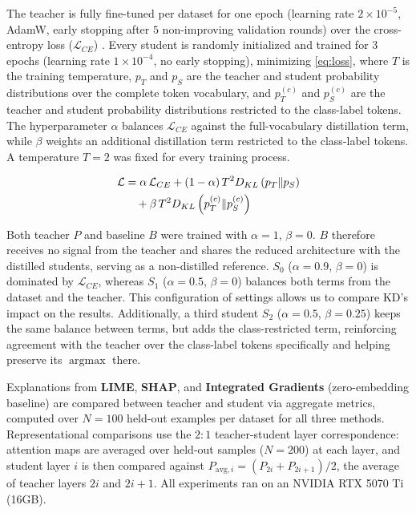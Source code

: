 \documentclass[conference]{IEEEtran}
\newcommand{\argmax}{\operatorname*{argmax}}
\begin{document}
The teacher is fully fine-tuned per dataset for one epoch (learning rate $2\times10^{-5}$, AdamW, early stopping after $5$ non-improving validation rounds) over the cross-entropy loss ($\mathcal{L}_{CE}$) \cite{goodfellow2016deep}. Every student is randomly initialized and trained for $3$ epochs (learning rate $1\times10^{-4}$, no early stopping), minimizing \eqref{eq:loss}, where $T$ is the training temperature, $p_T$ and $p_S$ are the teacher and student probability distributions over the complete token vocabulary, and $p_T^{(c)}$ and $p_S^{(c)}$ are the teacher and student probability distributions restricted to the class-label tokens. The hyperparameter $\alpha$ balances $\mathcal{L}_{CE}$ against the full-vocabulary distillation term, while $\beta$ weights an additional distillation term restricted to the class-label tokens. A temperature $T=2$ was fixed for every training process.

\begin{align}
\mathcal{L} &= \alpha\,\mathcal{L}_{CE} + (1-\alpha)\,T^2 D_{KL}\left(p_T \Vert p_S\right) \notag \\
&\quad + \beta\,T^2 D_{KL}\left(p_T^{(c)} \Vert p_S^{(c)}\right)
\label{eq:loss}
\end{align}

Both teacher $P$ and baseline $B$ were trained with $\alpha=1$, $\beta=0$. $B$ therefore receives no signal from the teacher and shares the reduced architecture with the distilled students, serving as a non-distilled reference. $S_0$ ($\alpha=0.9$, $\beta=0$) is dominated by $\mathcal{L}_{CE}$, whereas $S_1$ ($\alpha=0.5$, $\beta=0$) balances both terms from the dataset and the teacher. This configuration of settings allows us to compare KD's impact on the results. Additionally, a third student $S_2$ ($\alpha=0.5$, $\beta=0.25$) keeps the same balance between terms, but adds the class-restricted term, reinforcing agreement with the teacher over the class-label tokens specifically and helping preserve its $\argmax$ there.

Explanations from \textbf{LIME}, \textbf{SHAP}, and \textbf{Integrated Gradients} (zero-embedding baseline) are compared between teacher and student via aggregate metrics, computed over $N=100$ held-out examples per dataset for all three methods. Representational comparisons use the $2{:}1$ teacher-student layer correspondence: attention maps are averaged over held-out samples ($N=200$) at each layer, and student layer $i$ is then compared against $P_{\mathrm{avg},i}=(P_{2i}+P_{2i+1})/2$, the average of teacher layers $2i$ and $2i+1$. All experiments ran on an NVIDIA RTX 5070 Ti (16GB).
\end{document}
